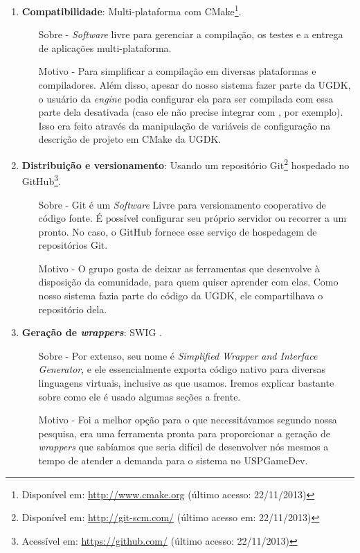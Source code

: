 \begin{enumerate}
    \item \textbf{Compatibilidade}: Multi-plataforma com CMake\footnote{Disponível
      em: \url{http://www.cmake.org} (último acesso: 22/11/2013)}.
      \begin{itemize}
        \item[Sobre -] \textit{Software} livre para gerenciar a compilação, os testes
          e a entrega de aplicações multi-plataforma.
        \item[Motivo -] Para simplificar a compilação em diversas plataformas e
          compiladores. Além disso, apesar do nosso sistema fazer parte
          da UGDK, o usuário da \textit{engine} podia configurar ela para ser
          compilada com essa parte dela desativada (caso ele não precise integrar
          com , por exemplo). Isso era feito através da manipulação de
          variáveis de configuração na descrição de projeto em CMake da UGDK.
      \end{itemize}

    \item \textbf{Distribuição e versionamento}: Usando um repositório
      Git\footnote{Disponível em: \url{http://git-scm.com/} (último acesso em: 22/11/2013)}
      hospedado no GitHub\footnote{Acessível em: \url{https://github.com/} (último
      acesso: 22/11/2013)}.
      \begin{itemize}
        \item[Sobre -] Git é um \textit{Software} Livre para versionamento cooperativo
          de código fonte. É possível configurar seu próprio servidor ou recorrer a um
          pronto. No caso, o GitHub fornece esse serviço de hospedagem de repositórios Git.
        \item[Motivo -] O grupo gosta de deixar as ferramentas que desenvolve à
          disposição da comunidade, para quem quiser aprender com elas. Como nosso
          sistema fazia parte do código da UGDK, ele compartilhava o repositório dela.
      \end{itemize}

    \item \textbf{Geração de \textit{wrappers}}: SWIG \cite{swig:00}.
      \begin{itemize}
        \item[Sobre -] Por extenso, seu nome é \emph{Simplified Wrapper and
          Interface Generator}, e ele essencialmente exporta código nativo
          para diversas linguagens virtuais, inclusive as que usamos. Iremos explicar
          bastante sobre como ele é usado algumas seções a frente.
        \item[Motivo -] Foi a melhor opção para o que necessitávamos segundo
          nossa pesquisa, era uma ferramenta pronta para proporcionar a
          geração de \textit{wrappers} que sabíamos que seria difícil de
          desenvolver nós mesmos a tempo de atender a demanda para o sistema
          no USPGameDev.
      \end{itemize}


\end{enumerate}
